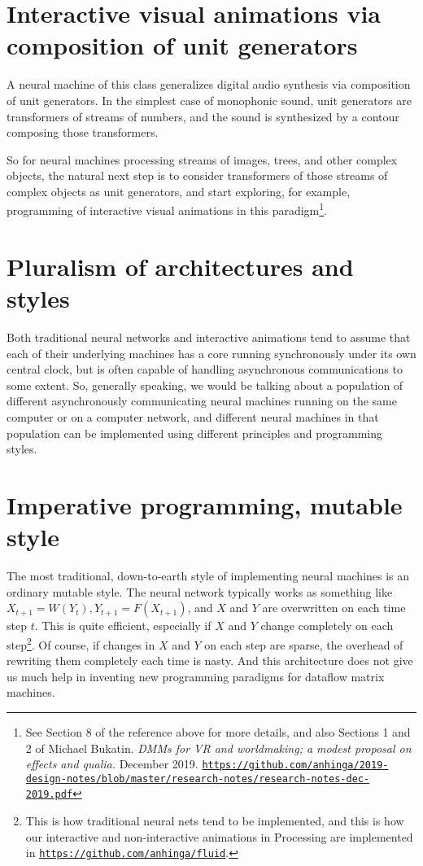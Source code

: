 \documentclass{article}
\begin{document}
\section{Interactive visual animations via composition of unit generators}

A neural machine of this class generalizes digital audio synthesis via composition of unit generators. In the simplest case
of monophonic sound, unit generators are transformers of streams of numbers, and the sound is synthesized by
a contour composing those transformers.

 So for neural machines processing streams of images, trees, and other complex objects,
the natural next step is to consider transformers of those streams of complex objects as unit generators, and start
exploring, for example, programming of interactive visual animations in this paradigm\footnote{See Section 8 of the reference above
for more details, and also Sections 1 and 2 of  Michael Bukatin. {\em DMMs for VR and worldmaking; a modest proposal on effects and qualia.} December 2019.
\href{https://github.com/anhinga/2019-design-notes/blob/master/research-notes/research-notes-dec-2019.pdf}{\tiny\tt https://github.com/anhinga/2019-design-notes/blob/master/research-notes/research-notes-dec-2019.pdf}}.

\section{Pluralism of architectures and styles}

Both traditional neural networks and interactive animations tend to assume that each of their underlying machines
has a core running synchronously under its own central clock, but is often capable of handling asynchronous communications to
some extent. So, generally speaking, we would be talking about a population of different asynchronously communicating
neural machines running on the same computer or on a computer network, and different neural machines in that population
can be implemented using different principles and programming styles. 

\section{Imperative programming, mutable style}

The most traditional, down-to-earth style of implementing neural machines is an ordinary mutable style.
The neural network typically works as something like $X_{t+1} = W(Y_{t}), Y_{t+1} = F(X_{t+1})$, and
$X$ and $Y$ are overwritten on each time step $t$. This is quite efficient, especially if $X$ and $Y$ change completely
on each step\footnote{This is how traditional neural nets tend to be
implemented, and this is how our interactive and non-interactive animations in Processing are implemented in 
\href{https://github.com/anhinga/fluid}{\tt https://github.com/anhinga/fluid}.}. Of course, if changes in
$X$ and $Y$ on each step are sparse, the overhead of rewriting them completely each time is nasty.
And this architecture does not give us much help in inventing new programming paradigms for dataflow
matrix machines.
\end{document}
